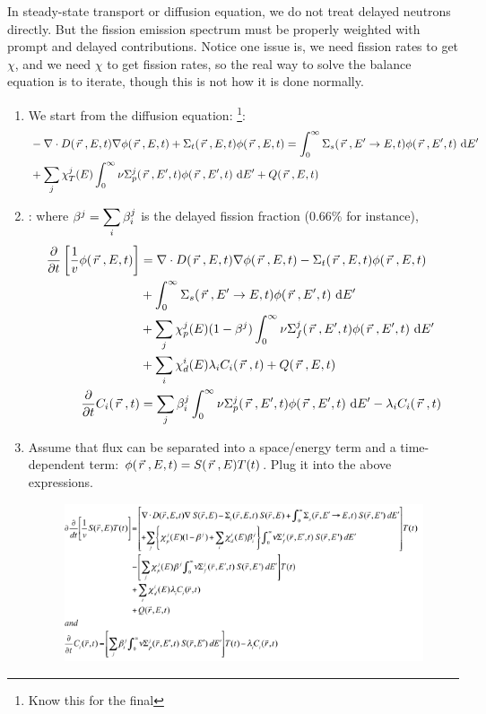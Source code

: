 \documentclass{school-22.211-notes}
\begin{document}
\clearpage
{}
In steady-state transport or diffusion equation, we do not treat delayed neutrons directly. But the fission emission spectrum must be properly weighted with prompt and delayed contributions. Notice one issue is, we need fission rates to get $\chi$, and we need $\chi$ to get fission rates, so the real way to solve the balance equation is to iterate, though this is not how it is done normally.
\begin{enumerate}
\item We start from the diffusion equation: \footnote{Know this for the final}: 
\small
\begin{align}
& - \nabla \cdot D(\left.\vec{r}\right., E, t) \nabla \phi(\left.\vec{r}\right., E, t) + \Sigma_t (\left.\vec{r}\right., E, t) \phi(\left.\vec{r}\right., E, t) = \int_0^{\infty} \Sigma_s (\left.\vec{r}\right., E'\to E, t) \phi(\left.\vec{r}\right., E', t) \mbox{ }\mathrm{d} E' \\
&+ \displaystyle\sum_j \chi_T^j (E) \int_0^{\infty} \nu \Sigma_p^j (\left.\vec{r}\right., E', t) \phi(\left.\vec{r}\right., E', t) \mbox{ }\mathrm{d} E' + Q(\left.\vec{r}\right., E, t) 
\end{align}
\normalsize

\item {}: where $\beta^j = \displaystyle\sum_i \beta_i^j$ is the delayed fission fraction (0.66\% for instance), 
  \begin{align}
    \frac{\partial}{\partial t} \left[ \frac{1}{v} \phi(\left.\vec{r}\right., E, t) \right] &= \nabla \cdot D(\left.\vec{r}\right., E, t) \nabla \phi(\left.\vec{r}\right., E, t) - \Sigma_t (\left.\vec{r}\right., E, t) \phi(\left.\vec{r}\right., E, t) \\
    & + \int_0^{\infty} \Sigma_s (\left.\vec{r}\right., E'\to E, t) \phi(\left.\vec{r}\right., E', t) \mbox{ }\mathrm{d} E' \\
    &+ \displaystyle\sum_j \chi_p^j (E) (1-\beta^j) \int_0^{\infty} \nu \Sigma_f^j (\left.\vec{r}\right., E', t) \phi(\left.\vec{r}\right., E', t) \mbox{ }\mathrm{d} E' \\
    &+ \displaystyle\sum_i \chi_d^i (E) \lambda_i C_i (\left.\vec{r}\right., t) + Q(\left.\vec{r}\right., E, t)\\
    \frac{\partial}{\partial t} C_i (\left.\vec{r}\right., t) &= \displaystyle\sum_j \beta_i^j \int_0^{\infty} \nu \Sigma_p^j (\left.\vec{r}\right., E', t) \phi(\left.\vec{r}\right., E', t) \mbox{ }\mathrm{d} E' - \lambda_i C_i (\left.\vec{r}\right., t) 
  \end{align}

\item Assume that flux can be separated into a space/energy term and a time-dependent term: $\phi(\left.\vec{r}\right., E, t) = S(\left.\vec{r}\right., E) T(t)$. Plug it into the above expressions. 
\begin{figure}[ht]
  \centering
  \includegraphics[width=5in]{images/pke/pke1.png}
\end{figure}


\end{enumerate}
\end{document}
